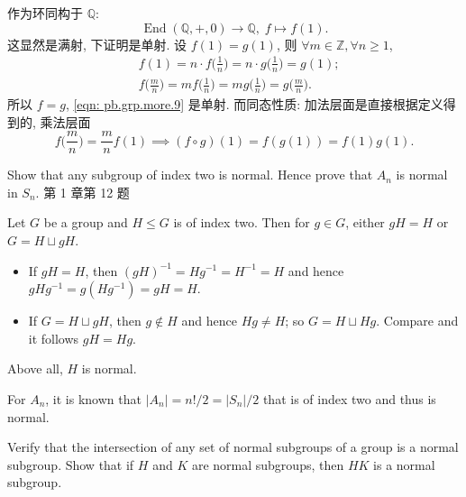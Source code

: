 \begin{solution}
    作为环同构于 $\mathbb{Q}$:
        \begin{equation}
            \label{eqn: pb.grp.more.9}
            \operatorname{End}(\mathbb{Q},+,0) \to \mathbb{Q},\; f\mapsto f(1). 
        \end{equation}
    这显然是满射, 下证明是单射. 设 $f(1)=g(1)$, 则 $\forall m\in\mathbb{Z},\forall n\geq1  $, 
        \[
            \begin{split}
                & f(1)=n\cdot f\Big(\frac{1}{n}\Big)=n\cdot g\Big(\frac{1}{n}\Big)=g(1);\\
                & f\Big(\frac{m}{n}\Big)=m f\Big(\frac{1}{n}\Big)=m g\Big(\frac{1}{n}\Big)=g\Big(\frac{m}{n}\Big).
            \end{split}
        \]
    所以 $f=g$, \eqref{eqn: pb.grp.more.9} 是单射. 而同态性质: 加法层面是直接根据定义得到的, 乘法层面
        \[
            f\Big(\frac{m}{n}\Big)=\frac{m}{n}f(1)\implies(f\circ g)(1)=f( g(1) )=f(1) g(1).
        \]
\end{solution}

\setcounter{pb}{11}

\begin{problem}
    Show that any subgroup of index two is normal. Hence prove that
    $A_n$ is normal in $S_n$. 第 1 章第 12 题
\end{problem}

\begin{solution}
    Let $G$ be a group and $H\leq G$ is of index two. Then for $g\in G$, either $ g H=H$ or $G=H\sqcup g H$. 
    \begin{itemize}
        \item If $g H=H$, then $(g H)^{-1}=H g^{-1}=H^{-1}=H$ and hence $g H g^{-1}=g (H g^{-1})=g H=H$.
        \item If $G=H\sqcup g H$, then $g\notin H$ and hence $H g\neq H$; so $G=H\sqcup H g$. Compare and it follows $g H =H g$.
    \end{itemize}
    Above all, $H$ is normal.
    \par For $A_{n}$, it is known that $|A_{n}|=n!/2=|S_{n}|/2$ that is of index two and thus is normal.
\end{solution}

\begin{problem}
    Verify that the intersection of any set of normal subgroups of a group is a normal subgroup. 
    Show that if $H$ and $K$ are normal subgroups, then $HK$ is a normal subgroup.
\end{problem}


